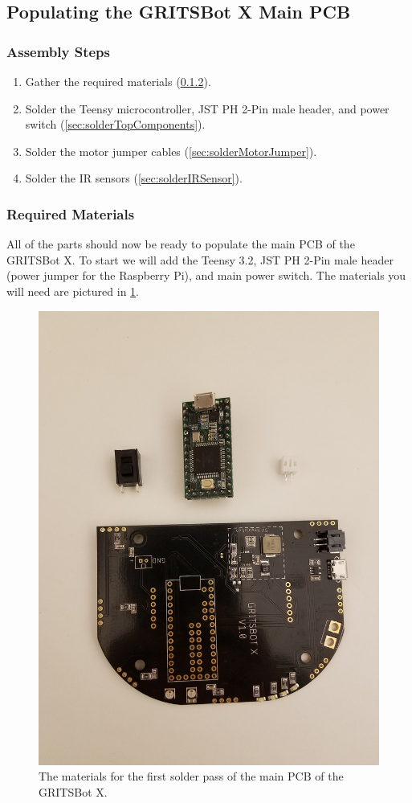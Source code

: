 \subsection{Populating the GRITSBot X Main PCB}
\label{sec:mainPCB}

 \subsubsection{Assembly Steps}
 
 \begin{enumerate}
 \item Gather the required materials (\cref{sec:mainPCBMaterials}).
 \item Solder the Teensy microcontroller, JST PH 2-Pin male header, and power switch (\cref{sec:solderTopComponents}).
 \item Solder the motor jumper cables (\cref{sec:solderMotorJumper}).
 \item Solder the IR sensors (\cref{sec:solderIRSensor}).
 \end{enumerate}
 
 \subsubsection{Required Materials}
 \label{sec:mainPCBMaterials}

All of the parts should now be ready to populate the main PCB of the GRITSBot X. To start we will add the Teensy 3.2, JST PH 2-Pin male header (power jumper for the Raspberry Pi), and main power switch. The materials you will need are pictured in \cref{fig:mainPCBFirstPass}.

\begin{figure}[h!]
\centering
\includegraphics[width=0.65\columnwidth, keepaspectratio]{./figs/20180912_112215.jpg}
\caption{The materials for the first solder pass of the main PCB of the GRITSBot X.}
\label{fig:mainPCBFirstPass}
\end{figure}

